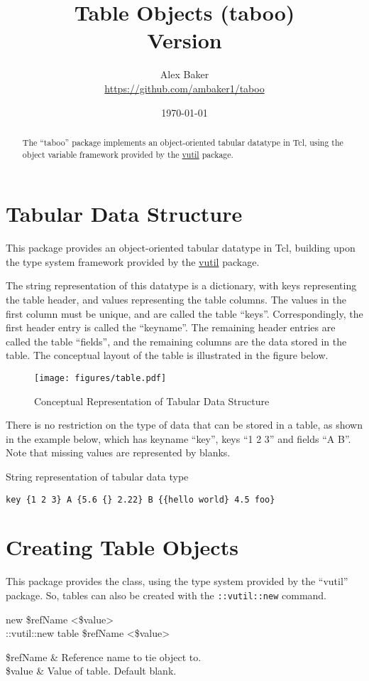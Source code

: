 \documentclass{article}
\title{\Huge{Table Objects (taboo)}\\\large Version \version}
\author{Alex Baker\\\small\url{https://github.com/ambaker1/taboo}}
\date{\small\today}
\begin{document}
\maketitle
\begin{abstract}
\begin{center}
The ``taboo'' package implements an object-oriented tabular datatype in Tcl, using the object variable framework provided by the \textcolor{blue}{\href{https://github.com/ambaker1/vutil}{vutil}} package.
\end{center}
\end{abstract}
\clearpage


\section{Tabular Data Structure}
This package provides an object-oriented tabular datatype in Tcl, building upon the type system framework provided by the \textcolor{blue}{\href{https://github.com/ambaker1/vutil}{vutil}} package.

The string representation of this datatype is a dictionary, with keys representing the table header, and values representing the table columns.
The values in the first column must be unique, and are called the table ``keys''. 
Correspondingly, the first header entry is called the ``keyname''. 
The remaining header entries are called the table ``fields'', and the remaining columns are the data stored in the table.
The conceptual layout of the table is illustrated in the figure below.
\vspace{\baselineskip}
\FloatBarrier
\begin{figure}[!htb]
    \centering
    \texttt{[image: figures/table.pdf]}
    \caption{Conceptual Representation of Tabular Data Structure}
    \label{fig:table_props}
\end{figure}
There is no restriction on the type of data that can be stored in a table, as shown in the example below, which has keyname ``key'', keys ``1 2 3'' and fields ``A B''.
Note that missing values are represented by blanks. 
\begin{example}{String representation of tabular data type}
\begin{lstlisting}
key {1 2 3} A {5.6 {} 2.22} B {{hello world} 4.5 foo}
\end{lstlisting}
\end{example}

\clearpage
\section{Creating Table Objects}
This package provides the  class, using the type system provided by the ``vutil'' package. 
So, tables can also be created with the \texttt{::vutil::new} command.
\begin{syntax}
 new \$refName <\$value> \\
::vutil::new table \$refName <\$value>
\end{syntax}
\begin{args}
\$refName & Reference name to tie object to. \\
\$value & Value of table. Default blank.
\end{args}
\end{document}
